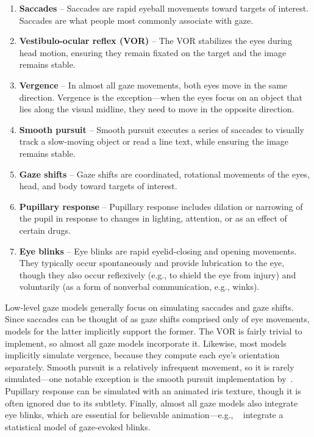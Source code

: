 \begin{enumerate}
\item \textbf{Saccades} -- Saccades are rapid eyeball movements toward targets of interest. Saccades are what people most commonly associate with gaze.
\item \textbf{Vestibulo-ocular reflex (VOR)} -- The VOR stabilizes the eyes during head motion, ensuring they remain fixated on the target and the image remains stable.
\item \textbf{Vergence} -- In almost all gaze movements, both eyes move in the same direction. Vergence is the exception---when the eyes focus on an object that lies along the visual midline, they need to move in the opposite direction.
\item \textbf{Smooth pursuit} -- Smooth pursuit executes a series of saccades to visually track a slow-moving object or read a line text, while ensuring the image remains stable.
\item \textbf{Gaze shifts} -- Gaze shifts are coordinated, rotational movements of the eyes, head, and body toward targets of interest.
\item \textbf{Pupillary response} -- Pupillary response includes dilation or narrowing of the pupil in response to changes in lighting, attention, or as an effect of certain drugs.
\item \textbf{Eye blinks} -- Eye blinks are rapid eyelid-closing and opening movements. They typically occur spontaneously and provide lubrication to the eye, though they also occur reflexively (e.g., to shield the eye from injury) and voluntarily (as a form of nonverbal communication, e.g., winks).
\end{enumerate}

Low-level gaze models generally focus on simulating saccades and gaze shifts. Since saccades can be thought of as gaze shifts comprised only of eye movements, models for the latter implicitly support the former. The VOR is fairly trivial to implement, so almost all gaze models incorporate it. Likewise, most models implicitly simulate vergence, because they compute each eye's orientation separately. Smooth pursuit is a relatively infrequent movement, so it is rarely simulated---one notable exception is the smooth pursuit implementation by~\citet{yeo2012eyecatch}. Pupillary response can be simulated with an animated iris texture, though it is often ignored due to its subtlety. Finally, almost all gaze models also integrate eye blinks, which are essential for believable animation---e.g., ~\citet{peters2010animating} integrate a statistical model of gaze-evoked blinks.

